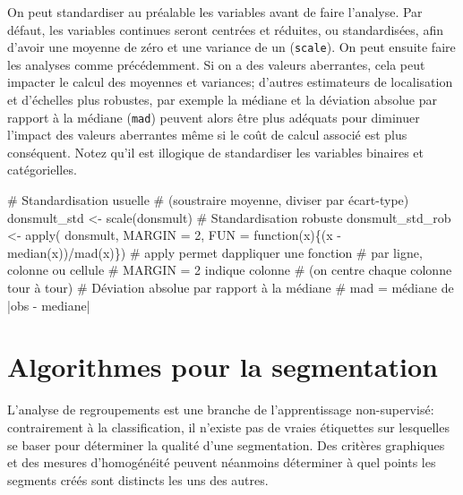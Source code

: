 \documentclass[
  11pt,
  letterpaper,
]{scrbook}
\newenvironment{Shaded}{\begin{snugshade}}{\end{snugshade}}
\newcommand{\AttributeTok}[1]{\textcolor[rgb]{0.40,0.45,0.13}{#1}}
\newcommand{\CommentTok}[1]{\textcolor[rgb]{0.37,0.37,0.37}{#1}}
\newcommand{\ControlFlowTok}[1]{\textcolor[rgb]{0.00,0.23,0.31}{#1}}
\newcommand{\DecValTok}[1]{\textcolor[rgb]{0.68,0.00,0.00}{#1}}
\newcommand{\FunctionTok}[1]{\textcolor[rgb]{0.28,0.35,0.67}{#1}}
\newcommand{\NormalTok}[1]{\textcolor[rgb]{0.00,0.23,0.31}{#1}}
\newcommand{\OtherTok}[1]{\textcolor[rgb]{0.00,0.23,0.31}{#1}}
\newcommand{\SpecialCharTok}[1]{\textcolor[rgb]{0.37,0.37,0.37}{#1}}
\theoremstyle{definition}
\theoremstyle{remark}
\begin{document}
On peut standardiser au préalable les variables avant de faire
l'analyse. Par défaut, les variables continues seront centrées et
réduites, ou standardisées, afin d'avoir une moyenne de zéro et une
variance de un (\texttt{scale}). On peut ensuite faire les analyses
comme précédemment. Si on a des valeurs aberrantes, cela peut impacter
le calcul des moyennes et variances; d'autres estimateurs de
localisation et d'échelles plus robustes, par exemple la médiane et la
déviation absolue par rapport à la médiane (\texttt{mad}) peuvent alors
être plus adéquats pour diminuer l'impact des valeurs aberrantes même si
le coût de calcul associé est plus conséquent. Notez qu'il est illogique
de standardiser les variables binaires et catégorielles.

\begin{Shaded}
\begin{Highlighting}[]
\CommentTok{\# Standardisation usuelle }
\CommentTok{\# (soustraire moyenne, diviser par écart{-}type)}
\NormalTok{donsmult\_std }\OtherTok{\textless{}{-}} \FunctionTok{scale}\NormalTok{(donsmult)}
\CommentTok{\# Standardisation robuste}
\NormalTok{donsmult\_std\_rob }\OtherTok{\textless{}{-}} \FunctionTok{apply}\NormalTok{(}
\NormalTok{  donsmult, }
  \AttributeTok{MARGIN =} \DecValTok{2}\NormalTok{, }
  \AttributeTok{FUN =} \ControlFlowTok{function}\NormalTok{(x)\{(x }\SpecialCharTok{{-}} \FunctionTok{median}\NormalTok{(x))}\SpecialCharTok{/}\FunctionTok{mad}\NormalTok{(x)\})}
\CommentTok{\# apply permet d\textquotesingle{}appliquer une fonction}
\CommentTok{\# par ligne, colonne ou cellule}
\CommentTok{\# MARGIN = 2 indique colonne }
\CommentTok{\# (on centre chaque colonne tour à tour)}
\CommentTok{\# Déviation absolue par rapport à la médiane}
\CommentTok{\# mad = médiane de |obs {-} mediane|}
\end{Highlighting}
\end{Shaded}

\hypertarget{algorithmes-pour-la-segmentation}{%
\section{Algorithmes pour la
segmentation}\label{algorithmes-pour-la-segmentation}}

L'analyse de regroupements est une branche de l'apprentissage
non-supervisé: contrairement à la classification, il n'existe pas de
vraies étiquettes sur lesquelles se baser pour déterminer la qualité
d'une segmentation. Des critères graphiques et des mesures d'homogénéité
peuvent néanmoins déterminer à quel points les segments créés sont
distincts les uns des autres.
\end{document}
